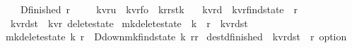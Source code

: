 \begin{isabellebody}
\ \ {\isacharbar}\ D{\isacharunderscore}finished\ {\isachardoublequoteopen}{\isacharprime}r{\isachardoublequoteclose}\ \isanewline
\ \ \isanewline
{}\isamarkupfalse%
\ {\isacharparenleft}{\isacharprime}k{\isacharcomma}{\isacharprime}v{\isacharcomma}{\isacharprime}r{\isacharparenright}u\ {\isacharequal}\ {\isachardoublequoteopen}{\isacharparenleft}{\isacharprime}k{\isacharcomma}{\isacharprime}v{\isacharcomma}{\isacharprime}r{\isacharparenright}fo\ {\isacharasterisk}\ {\isacharparenleft}{\isacharprime}k{\isacharcomma}{\isacharprime}r{\isacharparenright}rstk{\isachardoublequoteclose}\ \ \isanewline
{}\isamarkupfalse%
\ {\isacharparenleft}{\isacharprime}k{\isacharcomma}{\isacharprime}v{\isacharcomma}{\isacharprime}r{\isacharparenright}d\ {\isacharequal}\ {\isachardoublequoteopen}{\isacharparenleft}{\isacharprime}k{\isacharcomma}{\isacharprime}v{\isacharcomma}{\isacharprime}r{\isacharparenright}find{\isacharunderscore}state\ {\isacharasterisk}\ {\isacharprime}r{\isachardoublequoteclose}\isanewline
\isanewline
{}\isamarkupfalse%
\ {\isacharparenleft}{\isacharprime}k{\isacharcomma}{\isacharprime}v{\isacharcomma}{\isacharprime}r{\isacharparenright}dst\ {\isacharequal}\ {\isachardoublequoteopen}{\isacharparenleft}{\isacharprime}k{\isacharcomma}{\isacharprime}v{\isacharcomma}{\isacharprime}r{\isacharparenright}\ delete{\isacharunderscore}state{\isachardoublequoteclose}\isanewline
\isanewline
{}\isamarkupfalse%
\ mk{\isacharunderscore}delete{\isacharunderscore}state\ {\isacharcolon}{\isacharcolon}\ {\isachardoublequoteopen}{\isacharprime}k\ {\isasymRightarrow}\ {\isacharprime}r\ {\isasymRightarrow}\ {\isacharparenleft}{\isacharprime}k{\isacharcomma}{\isacharprime}v{\isacharcomma}{\isacharprime}r{\isacharparenright}dst{\isachardoublequoteclose}\ \isanewline
{\isachardoublequoteopen}mk{\isacharunderscore}delete{\isacharunderscore}state\ k\ r\ {\isacharequal}\ {\isacharparenleft}D{\isacharunderscore}down{\isacharparenleft}mk{\isacharunderscore}find{\isacharunderscore}state\ k\ r{\isacharcomma}r{\isacharparenright}{\isacharparenright}{\isachardoublequoteclose}\isanewline
\isanewline
{}\isamarkupfalse%
\ dest{\isacharunderscore}d{\isacharunderscore}finished\ {\isacharcolon}{\isacharcolon}\ {\isachardoublequoteopen}{\isacharparenleft}{\isacharprime}k{\isacharcomma}{\isacharprime}v{\isacharcomma}{\isacharprime}r{\isacharparenright}dst\ {\isasymRightarrow}\ {\isacharprime}r\ option{\isachardoublequoteclose}\ \isanewline

\end{isabellebody}
